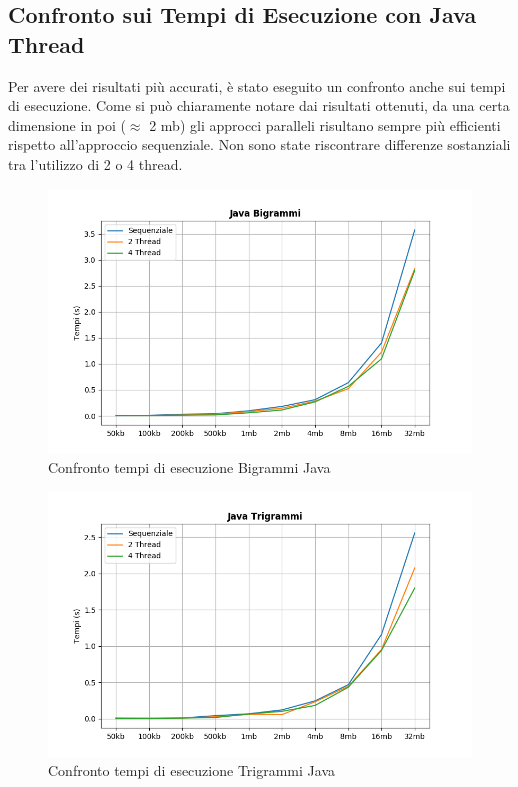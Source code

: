 \documentclass[10pt,twocolumn,letterpaper]{article}
\begin{document}
\subsection{Confronto sui Tempi di Esecuzione con Java Thread}
Per avere dei risultati più accurati, è stato eseguito un  confronto anche sui tempi di esecuzione.\newline
Come si può chiaramente notare dai risultati ottenuti, da una certa dimensione in poi ($\approx$ 2 mb) gli approcci paralleli risultano sempre più efficienti rispetto all'approccio sequenziale. Non sono state riscontrare differenze sostanziali tra l'utilizzo di 2 o 4 thread.
\begin{figure}[h]
\includegraphics[width=\linewidth]{Plots/tempi_java_bigrammi.png}
\caption{Confronto tempi di esecuzione Bigrammi Java}
\end{figure}

\begin{figure}[h]
\includegraphics[width=\linewidth]{Plots/tempi_java_trigrammi.png}
\caption{Confronto tempi di esecuzione Trigrammi Java}
\end{figure}
\newpage
\end{document}

